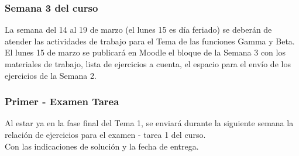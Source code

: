 \documentclass[12pt]{beamer}
\begin{document}
\begin{frame}
\frametitle{Semana 3 del curso}
La semana del 14 al 19 de marzo (el lunes 15 es día feriado) se deberán de atender las actividades de trabajo para el Tema de las funciones Gamma y Beta.
\\
\bigskip
\pause
El lunes 15 de marzo se publicará en Moodle el bloque de la Semana 3 con los materiales de trabajo, lista de ejercicios a cuenta, el espacio para el envío de los ejercicios de la Semana 2.
\end{frame}
\begin{frame}
\frametitle{Primer - Examen Tarea}
Al estar ya en la fase final del Tema 1, se enviará durante la siguiente semana la relación de ejercicios para el examen - tarea 1 del curso.
\\
\bigskip
\pause
Con las indicaciones de solución y la fecha de entrega.
\end{frame}
\end{document}
